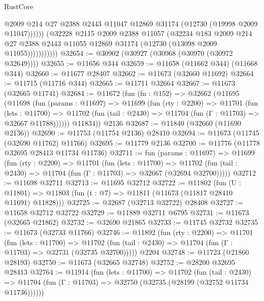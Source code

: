 \begin{lexlean}{RustCore}
\begin{coremodule}
                          @2009
                          @214
                          @27
                          @2388
                          @2443
                          @11047
                          @12869
                          @31174
                          (@12730 (@19998 @2009 @11047))))))
                  (@32228
                    @2115
                    @2009
                    @2388
                    @11057
                    (@32234
                      @183
                      @2009
                      @214
                      @27
                      @2388
                      @2443
                      @11055
                      @12869
                      @31174
                      (@12730 (@13098 @2009 @11055)))))))))))
@32654 := @30902 (@30927 (@30968 (@30970 (@30972 @32649))))
@32655 := @11656 @344
@32659 := @11658 (@11662 @344) (@11668 @344)
@32660 := @11677 @28407
@32662 := @11673 (@32660 @11692)
@32664 := @11715 (@11716 @344)
@32665 := @11711 @32664
@32667 := @11673 (@32665 @11741)
@32684 := @11672
    (fun (fn : @152) =>
    @32662
      (@11695
        (@11698
          (fun (params : @11697) =>
          @11699
            (fun (rty : @2200) =>
            @11701
              (fun (lets : @11700) =>
              @11702 (fun (tail : @2430) => @11704 (fun (Γ : @11703) => @32667 @11788))))))
        @11834))
    @2136
@32687 := @11840 (@32660 (@11690 @2136))
@32690 := @11753 (@11754 @2136) @28410
@32694 := @11673 (@11745 (@32690 @11762) @11766)
@32695 := @11779 @2136
@32700 := @11776 (@11778 @32695 @28413 @11734 @11736)
@32711 := fun (params : @11697) =>
  @11699
    (fun (rty : @2200) =>
    @11701
      (fun (lets : @11700) =>
      @11702 (fun (tail : @2430) => @11704 (fun (Γ : @11703) => @32667 (@32694 @32700)))))
@32712 := @11698 @32711
@32713 := @11695 @32712
@32722 := @11802
    (fun (U : @11801) => @11803 (fun (t : @7) => @11811 (@11673 (@11817 @28410 @11691) @11828)))
@32725 := @32687 (@32713 @32722) @28408
@32727 := @11658 @32712 @32722
@32729 := @11889 @32711 @6795
@32731 := @11673 (@32665 @21862)
@32732 := @32690 @21865
@32733 := @11745 @32732
@32735 := @11673 (@32733 @11766)
@32746 := @11892
    (fun (rty : @2200) =>
    @11701
      (fun (lets : @11700) =>
      @11702 (fun (tail : @2430) => @11704 (fun (Γ : @11703) => @32731 (@32735 @32700)))))
    @2204
@32748 := @11723 (@21860 @28193)
@32750 := @11673 (@32665 @32748)
@32752 := @28200 @32695 @28413
@32764 := @11914
    (fun (lets : @11700) =>
    @11702
      (fun (tail : @2430) =>
      @11704 (fun (Γ : @11703) => @32750 (@32735 (@28199 (@32752 @11734 @11736))))))

\end{coremodule}
\end{lexlean}
